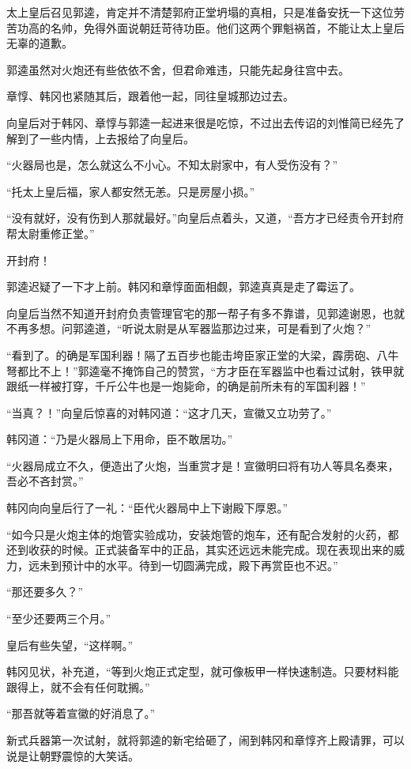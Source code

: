 太上皇后召见郭逵，肯定并不清楚郭府正堂坍塌的真相，只是准备安抚一下这位劳苦功高的名帅，免得外面说朝廷苛待功臣。他们这两个罪魁祸首，不能让太上皇后无辜的道歉。

郭逵虽然对火炮还有些依依不舍，但君命难违，只能先起身往宫中去。

章惇、韩冈也紧随其后，跟着他一起，同往皇城那边过去。

向皇后对于韩冈、章惇与郭逵一起进来很是吃惊，不过出去传诏的刘惟简已经先了解到了一些内情，上去报给了向皇后。

“火器局也是，怎么就这么不小心。不知太尉家中，有人受伤没有？”

“托太上皇后福，家人都安然无恙。只是房屋小损。”

“没有就好，没有伤到人那就最好。”向皇后点着头，又道，“吾方才已经责令开封府帮太尉重修正堂。”

开封府！

郭逵迟疑了一下才上前。韩冈和章惇面面相觑，郭逵真真是走了霉运了。

向皇后当然不知道开封府负责管理官宅的那一帮子有多不靠谱，见郭逵谢恩，也就不再多想。问郭逵道，“听说太尉是从军器监那边过来，可是看到了火炮？”

“看到了。的确是军国利器！隔了五百步也能击垮臣家正堂的大梁，霹雳砲、八牛弩都比不上！”郭逵毫不掩饰自己的赞赏，“方才臣在军器监中也看过试射，铁甲就跟纸一样被打穿，千斤公牛也是一炮毙命，的确是前所未有的军国利器！”

“当真？！”向皇后惊喜的对韩冈道：“这才几天，宣徽又立功劳了。”

韩冈道：“乃是火器局上下用命，臣不敢居功。”

“火器局成立不久，便造出了火炮，当重赏才是！宣徽明曰将有功人等具名奏来，吾必不吝封赏。”

韩冈向向皇后行了一礼：“臣代火器局中上下谢殿下厚恩。”

“如今只是火炮主体的炮管实验成功，安装炮管的炮车，还有配合发射的火药，都还到收获的时候。正式装备军中的正品，其实还远远未能完成。现在表现出来的威力，远未到预计中的水平。待到一切圆满完成，殿下再赏臣也不迟。”

“那还要多久？”

“至少还要两三个月。”

皇后有些失望，“这样啊。”

韩冈见状，补充道，“等到火炮正式定型，就可像板甲一样快速制造。只要材料能跟得上，就不会有任何耽搁。”

“那吾就等着宣徽的好消息了。”

新式兵器第一次试射，就将郭逵的新宅给砸了，闹到韩冈和章惇齐上殿请罪，可以说是让朝野震惊的大笑话。


